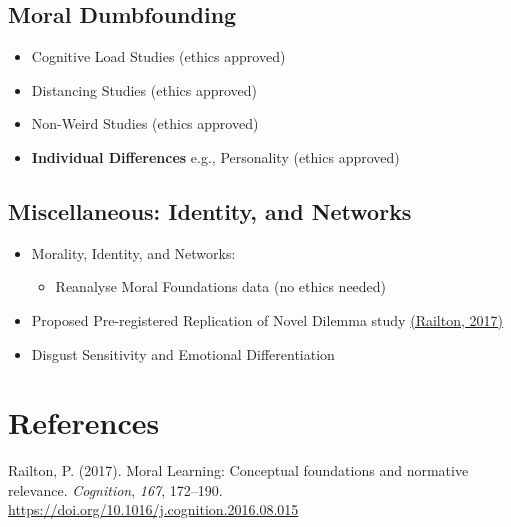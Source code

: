 \documentclass[
]{article}
\providecommand{\tightlist}{%
  \setlength{\itemsep}{0pt}\setlength{\parskip}{0pt}}
\newlength{\cslhangindent}
\newenvironment{cslreferences}%
  {\setlength{\parindent}{0pt}%
  \everypar{\setlength{\hangindent}{\cslhangindent}}\ignorespaces}%
  {\par}
\begin{document}
\hypertarget{moral-dumbfounding}{%
\subsection{Moral Dumbfounding}\label{moral-dumbfounding}}

\begin{itemize}
\tightlist
\item
  Cognitive Load Studies (ethics approved)
\item
  Distancing Studies (ethics approved)
\item
  Non-Weird Studies (ethics approved)
\item
  \textbf{Individual Differences} e.g., Personality (ethics approved)
\end{itemize}

\hypertarget{miscellaneous-identity-and-networks}{%
\subsection{Miscellaneous: Identity, and
Networks}\label{miscellaneous-identity-and-networks}}

\begin{itemize}
\tightlist
\item
  Morality, Identity, and Networks:

  \begin{itemize}
  \tightlist
  \item
    Reanalyse Moral Foundations data (no ethics needed)
  \end{itemize}
\item
  Proposed Pre-registered Replication of Novel Dilemma study
  \href{https://drive.google.com/drive/folders/1-D_LgP687zYjRG5893pzAUYDykFt-F3I?usp=sharing}{\color{blue}(Railton,
  2017)\color{black}}
\item
  Disgust Sensitivity and Emotional Differentiation
\end{itemize}

\pagebreak

\hypertarget{references}{%
\section*{References}\label{references}}

\hypertarget{refs}{}
\begin{cslreferences}
\leavevmode\hypertarget{ref-railton_moral_2017}{}%
Railton, P. (2017). Moral Learning: Conceptual foundations and normative
relevance. \emph{Cognition}, \emph{167}, 172--190.
\url{https://doi.org/10.1016/j.cognition.2016.08.015}
\end{cslreferences}
\end{document}
